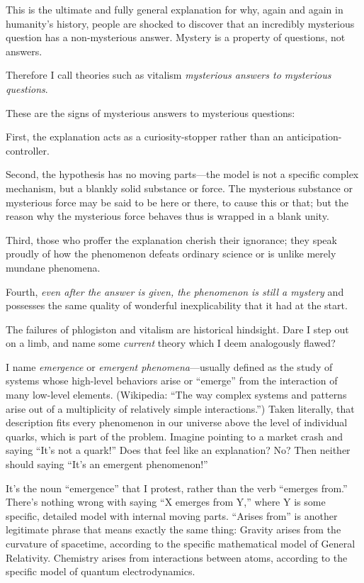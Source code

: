 {
 This is the ultimate and fully general explanation for why, again
and again in humanity's history, people are shocked to
discover that an incredibly mysterious question has a non-mysterious
answer. Mystery is a property of questions, not answers.}

{
 Therefore I call theories such as vitalism \textit{mysterious
answers to mysterious questions}.}

{
 These are the signs of mysterious answers to mysterious
questions:}

{
 First, the explanation acts as a curiosity-stopper rather than an
anticipation-controller.}

{
 Second, the hypothesis has no moving parts---the model is not a
specific complex mechanism, but a blankly solid substance or force. The
mysterious substance or mysterious force may be said to be here or
there, to cause this or that; but the reason why the mysterious force
behaves thus is wrapped in a blank unity.}

{
 Third, those who proffer the explanation cherish their ignorance;
they speak proudly of how the phenomenon defeats ordinary science or is
unlike merely mundane phenomena.}

{
 Fourth, \textit{even after the answer is given, the phenomenon is
still a mystery} and possesses the same quality of wonderful
inexplicability that it had at the start.}

\myendsectiontext


\bigskip


{
 The failures of phlogiston and vitalism are historical hindsight.
Dare I step out on a limb, and name some \textit{current} theory which
I deem analogously flawed? }

{
 I name \textit{emergence} or \textit{emergent
phenomena}{}---usually defined as the study of systems whose high-level
behaviors arise or ``emerge'' from
the interaction of many low-level elements. (Wikipedia:
``The way complex systems and patterns arise out of a
multiplicity of relatively simple interactions.'')
Taken literally, that description fits every phenomenon in our universe
above the level of individual quarks, which is part of the problem.
Imagine pointing to a market crash and saying
``It's not a
quark!'' Does that feel like an explanation? No? Then
neither should saying ``It's an
emergent phenomenon!''}

{
 It's the noun
``emergence'' that I protest, rather
than the verb ``emerges from.''
There's nothing wrong with saying ``X
emerges from Y,'' where Y is some specific, detailed
model with internal moving parts. ``Arises
from'' is another legitimate phrase that means
exactly the same thing: Gravity arises from the curvature of spacetime,
according to the specific mathematical model of General Relativity.
Chemistry arises from interactions between atoms, according to the
specific model of quantum electrodynamics.}

